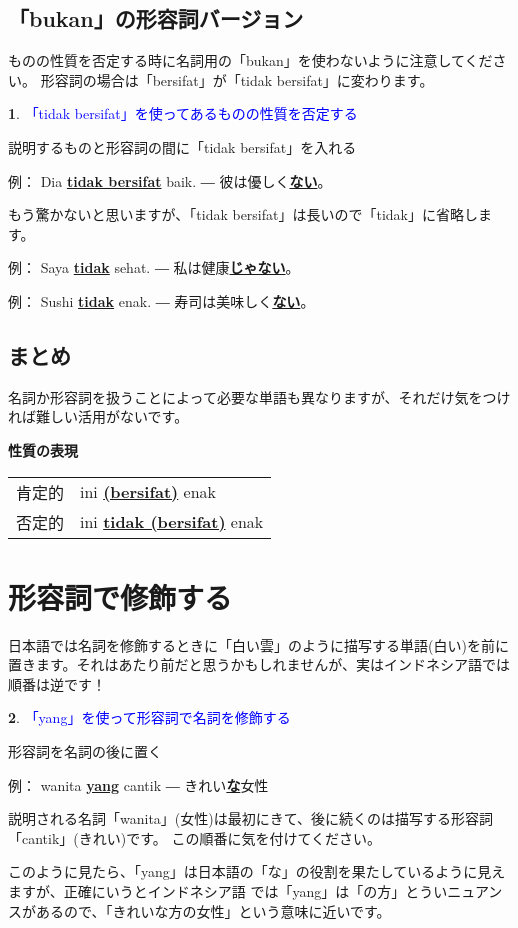 \documentclass[uplatex]{jsarticle}
\theoremstyle{definition}
\newtheorem*{grammarpoint*}{}
\newcommand{\grammarpoint}[1]{
\begin{grammarpoint*}
  \textcolor{blue}{#1}
\end{grammarpoint*}
}
\newcommand{\example}[2]{
例： #1 ― #2
}
\newcommand{\bu}[1]{\underline{\textbf{#1}}}
\newcommand{\bi}[1]{\bu{#1}}
\newcommand{\bj}[1]{\bu{#1}}
\begin{document}
\subsection*{「bukan」の形容詞バージョン}

ものの性質を否定する時に名詞用の「bukan」を使わないように注意してください。
形容詞の場合は「bersifat」が「tidak bersifat」に変わります。

\grammarpoint{「tidak bersifat」を使ってあるものの性質を否定する}

説明するものと形容詞の間に「tidak bersifat」を入れる

\example{Dia \bi{tidak bersifat} baik.}{彼は優しく\bj{ない}。}

もう驚かないと思いますが、「tidak bersifat」は長いので「tidak」に省略します。

\example{Saya \bi{tidak} sehat.}{私は健康\bj{じゃない}。}

\example{Sushi \bi{tidak} enak.}{寿司は美味しく\bj{ない}。}

\subsection*{まとめ}

名詞か形容詞を扱うことによって必要な単語も異なりますが、それだけ気をつければ難しい活用がないです。

\textbf{性質の表現}

\begin{tabular}{ll}
肯定的 & ini \bi{(bersifat)} enak \\
否定的 & ini \bi{tidak (bersifat)} enak
\end{tabular}

\section{形容詞で修飾する}

日本語では名詞を修飾するときに「白い雲」のように描写する単語(白い)を前に置きます。それはあたり前だと思うかもしれませんが、実はインドネシア語では順番は逆です！

\grammarpoint{「yang」を使って形容詞で名詞を修飾する}

形容詞を名詞の後に置く

\example{wanita \bi{yang} cantik}{きれい\bi{な}女性}

説明される名詞「wanita」(女性)は最初にきて、後に続くのは描写する形容詞「cantik」(きれい)です。
この順番に気を付けてください。

このように見たら、「yang」は日本語の「な」の役割を果たしているように見えますが、正確にいうとインドネシア語
では「yang」は「の方」とういニュアンスがあるので、「きれいな方の女性」という意味に近いです。
\end{document}
